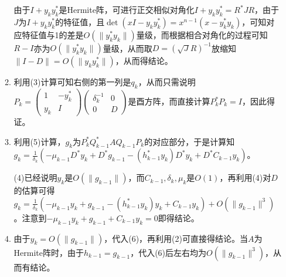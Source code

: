 \documentclass[a4paper,UTF8,fontset=windows]{ctexart}
\begin{document}
\begin{enumerate}
\begin{enumerate}[(1)]
由于$I+y_ky_k^*$是Hermite阵，可进行正交相似对角化$I+y_ky_k^*=R^*JR$，由于$J$为$I+y_ky_k^*$的特征值，且$\det(xI-y_ky_k^*)=x^{n-1}(x-y_k^*y_k)$，可知对应特征值与1的差是$O(\|y_k^*y_k\|)$量级，而根据相合对角化的过程可知$R-I$亦为$O(\|y_k^*y_k\|)$量级，从而取$D=(\sqrt{J}R)^{-1}$放缩知$\|I-D\|=O(\|y_ky_k^*\|)$，从而得结论。

\item
利用(3)计算可知右侧的第一列是$q_k$，从而只需说明$P_k=\begin{pmatrix}1&-y_k^*\\y_k&I\end{pmatrix}\begin{pmatrix}\delta_k^{-1}&0\\0&D\end{pmatrix}$是酉方阵，而直接计算$P_k^*P_k=I$，因此得证。

\item
利用(5)计算，$g_k$为$P_k^*Q_{k-1}^*AQ_{k-1}P_k$的对应部分，于是计算知$g_k=\frac{1}{\delta_k}(-\mu_{k-1}D^*y_k+D^*g_{k-1}-(h_{k-1}^*y_k)D^*y_k+D^*C_{k-1}y_k)$。

(4)已经说明$y_k$是$O(\|g_{k-1}\|)$，而$C_{k-1},\delta_k,\mu_k$是$O(1)$，再利用(4)对$D$的估算可得$g_k=\frac{1}{\delta_k}(-\mu_{k-1}y_k+g_{k-1}-(h_{k-1}^*y_k)y_k+C_{k-1}y_k)+O(\|g_{k-1}\|^3)$。注意到$-\mu_{k-1}y_k+g_{k-1}+C_{k-1}y_k=0$即得结论。

\item
由于$y_k=O(\|g_{k-1}\|)$，代入(6)，再利用(2)可直接得结论。当$A$为Hermite阵时，由于$h_{k-1}=g_{k-1}$，代入(6)后左右均为$O(\|g_{k-1}\|^3)$，从而有结论。
\end{enumerate}
\end{enumerate}
\end{document}
